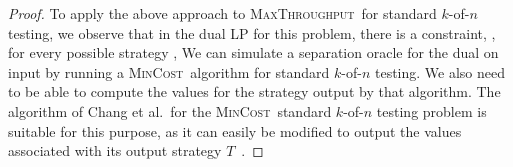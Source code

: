 \documentclass{article}
\newcounter{ass}
\newcommand{\ens}[1]{\ensuremath{#1}}					\newcommand{\card}[1]{\ens{|#1|}}							\newcommand{\dotlist}[2]{\ens{#1,\ldots,#2}}
\newcommand{\valn}{\ens{n}}
\newcommand{\valk}{\ens{k}}
\newcommand{\maxthru}{\textsc{MaxThroughput}}
\newcommand{\mincost}{\textsc{MinCost}}
\newcommand{\kofn}{\valk-of-\valn}
\newcommand{\strategy}{\ens{T}}
\begin{document}
\begin{proof}
To apply the above approach to \maxthru\ for standard \kofn{} testing,
we observe that in the dual LP for this problem,
there is a constraint, 
,
for every possible strategy ,
We can simulate a separation
oracle for the dual on input  by
running a \mincost\ algorithm for standard \kofn{} testing.
We also need to be able to compute the  values for the
strategy output by that algorithm.
The algorithm of 
Chang et al.~for the \mincost\ standard \kofn{} testing problem is suitable for this purpose,
as it can easily be modified to output
the  values associated with its output strategy \strategy~\cite{journals/tc/ChangSF90}. 
\end{proof}



\end{document}
